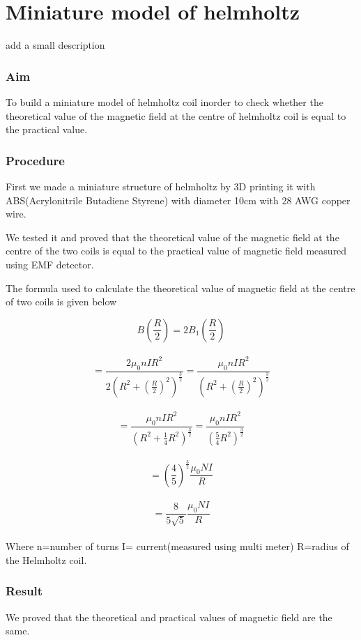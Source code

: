 \chapter{Miniature model of helmholtz}

add a small description

\subsection{Aim}

\vspace{15pt}

To build a miniature model of helmholtz coil inorder to check whether the theoretical value of the magnetic field at the centre of helmholtz coil is equal to the practical value.

\subsection{Procedure}

First we made a miniature structure of helmholtz by 3D printing it with ABS(Acrylonitrile Butadiene Styrene) with diameter 10cm with 28 AWG copper wire.\\

\par We tested it and proved that the theoretical value of the magnetic field at the centre of the two coils is equal to the practical value of magnetic field measured using EMF detector.

\vspace{15pt}

\par The formula used to calculate the theoretical value of magnetic field at the centre of two coils is given below

$$B \left(\frac{R}{2}\right) =  2B_1 \left(\frac{R}{2}\right)$$\\
                    $$= \frac{2\mu_0 nI R^{2}}{2\left(R^{2} + \left(\frac{R}{2}\right)^{2}\right)^{\frac{3}{2}}} =  \frac{\mu_0 nI R^{2}}{\left(R^{2} + \left(\frac{R}{2}\right)^{2}\right)^{\frac{3}{2}}}$$\\
$$= \frac{\mu_0 nI R^{2}}{\left(R^{2} + \frac{1}{4}R^{2}\right)^{\frac{3}{2}}} =  \frac{\mu_0 nI R^{2}}{\left(\frac{5}{4}R^{2}\right)^{\frac{3}{2}}}$$\\
$$= \left(\frac{4}{5}\right)^{\frac{3}{2}}\frac{\mu_0 NI}{R}$$\\
$$= \frac{8}{5\sqrt{5}}\frac{\mu_0 NI}{R}$$\\

            Where n=number of turns
            I= current(measured using multi meter)
            R=radius of the Helmholtz coil.
\subsection{Result}
We proved that the theoretical and practical values of magnetic field are the same.
